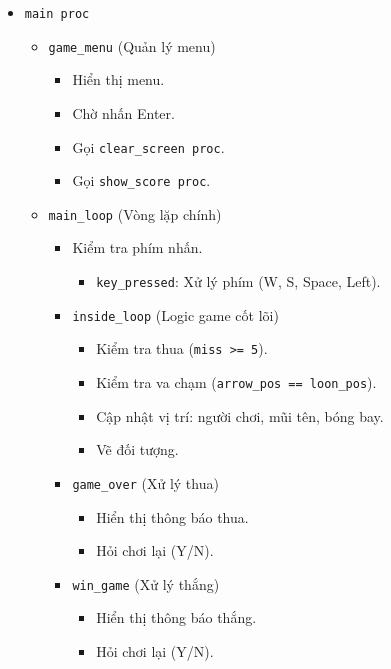 \documentclass[12pt,a4paper,openany,oneside]{report}
\begin{document}
\begin{itemize}[leftmargin=*, itemsep=1pt, parsep=1pt]
    \item \texttt{main proc} 
    \begin{itemize}
        \item \texttt{game\_menu} (Quản lý menu)
        \begin{itemize}
            \item Hiển thị menu.
            \item Chờ nhấn Enter.
            \item Gọi \texttt{clear\_screen proc}.
            \item Gọi \texttt{show\_score proc}.
        \end{itemize}
        \item \texttt{main\_loop} (Vòng lặp chính)
        \begin{itemize}
            \item Kiểm tra phím nhấn.
            \begin{itemize}
                \item \texttt{key\_pressed}: Xử lý phím (W, S, Space, Left).
            \end{itemize}
            \item \texttt{inside\_loop} (Logic game cốt lõi)
            \begin{itemize}
                \item Kiểm tra thua (\texttt{miss >= 5}).
                \item Kiểm tra va chạm (\texttt{arrow\_pos == loon\_pos}).
                \item Cập nhật vị trí: người chơi, mũi tên, bóng bay.
                \item Vẽ đối tượng.
            \end{itemize}
            \item \texttt{game\_over} (Xử lý thua)
            \begin{itemize}
                \item Hiển thị thông báo thua.
                \item Hỏi chơi lại (Y/N).
            \end{itemize}
            \item \texttt{win\_game} (Xử lý thắng)
            \begin{itemize}
                \item Hiển thị thông báo thắng.
                \item Hỏi chơi lại (Y/N).

\end{itemize}
\end{itemize}
\end{itemize}
\end{itemize}
\end{document}
